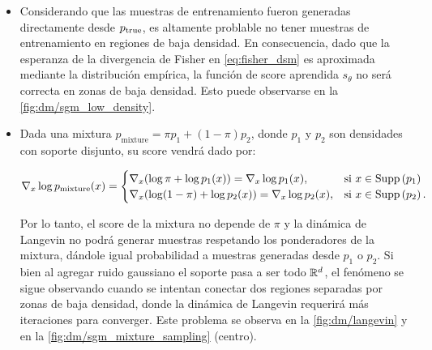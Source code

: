 \begin{itemize}
    \item Considerando que las muestras de entrenamiento fueron generadas directamente desde $p_{\operatorname{true}}$, es altamente problable no tener muestras de entrenamiento en regiones de baja densidad. En consecuencia, dado que la esperanza de la divergencia de Fisher en \eqref{eq:fisher_dsm} es aproximada mediante la distribución empírica, la función de score aprendida $s_\theta$ no será correcta en zonas de baja densidad. Esto puede observarse en la \autoref{fig:dm/sgm_low_density}.


    \item Dada una mixtura $p_{\text{mixture}} = \pi p_1 + (1-\pi) p_2$, donde $p_1$ y $p_2$ son densidades con soporte disjunto, su score vendrá dado por:

          \begin{equation*}
              \nabla_{x} \log p_{\text{mixture}}(x) = \begin{cases}
                  \nabla_x (\log \pi + \log p_1(x)) = \nabla_x\log p_1(x),     & \text{si } x\in\operatorname{Supp}\left(p_1\right)   \\
                  \nabla_x (\log (1-\pi) + \log p_2(x)) = \nabla_x\log p_2(x), & \text{si } x\in\operatorname{Supp}\left(p_2\right) .
              \end{cases}
          \end{equation*}

          Por lo tanto, el score de la mixtura no depende de $\pi$ y la dinámica de Langevin no podrá generar muestras respetando los ponderadores de la mixtura, dándole igual probabilidad a muestras generadas desde $p_1$ o $p_2$. Si bien al agregar ruido gaussiano el soporte pasa a ser todo $\mathbb{R}^d$, el fenómeno se sigue observando cuando se intentan conectar dos regiones separadas por zonas de baja densidad, donde la dinámica de Langevin requerirá más iteraciones para converger. Este problema se observa en la \autoref{fig:dm/langevin} y en la \autoref{fig:dm/sgm_mixture_sampling} (centro).
\end{itemize}

